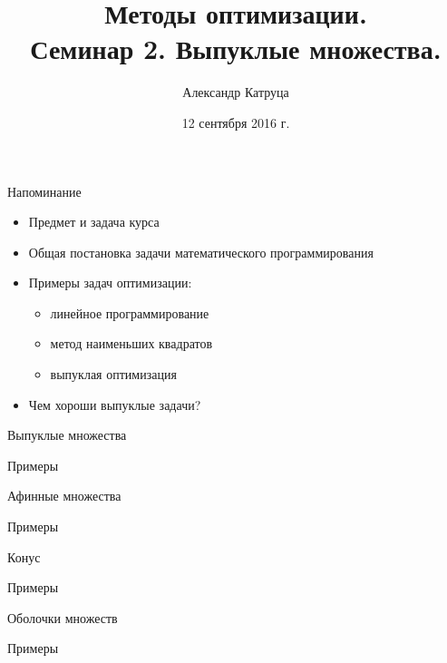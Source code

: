 \documentclass[12pt]{beamer}
\title[Семинар 1]{Методы оптимизации. \\
Семинар 2. Выпуклые множества.}
\author{Александр Катруца}
\institute{Московский физико-технический институт,\\
Факультет Управления и Прикладной Математики}
\date{12 сентября 2016 г.}
\begin{document}
\begin{frame}
\maketitle
\end{frame}

\begin{frame}{Напоминание}

\begin{itemize}
\item Предмет и задача курса
\item Общая постановка задачи математического программирования
\item Примеры задач оптимизации: 
\begin{itemize}
\item линейное программирование
\item метод наименьших квадратов
\item выпуклая оптимизация
\end{itemize}
\item Чем хороши выпуклые задачи?

\end{itemize}

\end{frame}

\begin{frame}{Выпуклые множества}

\end{frame}

\begin{frame}{Примеры}

\end{frame}

\begin{frame}{Афинные множества}

\end{frame}

\begin{frame}{Примеры}

\end{frame}

\begin{frame}{Конус}

\end{frame}

\begin{frame}{Примеры}

\end{frame}

\begin{frame}{Оболочки множеств}

\end{frame}

\begin{frame}{Примеры}

\end{frame}
\end{document}
